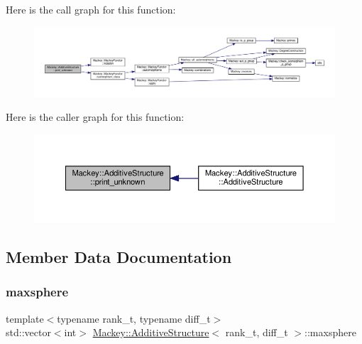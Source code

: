 Here is the call graph for this function\+:\nopagebreak
\begin{figure}[H]
\begin{center}
\leavevmode
\includegraphics[width=350pt]{classMackey_1_1AdditiveStructure_a6c68d66e89c3ad3a81dde8fd35837c3c_cgraph}
\end{center}
\end{figure}
Here is the caller graph for this function\+:\nopagebreak
\begin{figure}[H]
\begin{center}
\leavevmode
\includegraphics[width=350pt]{classMackey_1_1AdditiveStructure_a6c68d66e89c3ad3a81dde8fd35837c3c_icgraph}
\end{center}
\end{figure}


\subsection{Member Data Documentation}
\mbox{\label{classMackey_1_1AdditiveStructure_a1d26ee2b19d9d66744ee4d79c302d9c4}} 
\subsubsection{\texorpdfstring{maxsphere}{maxsphere}}
{\footnotesize\ttfamily template$<$typename rank\+\_\+t, typename diff\+\_\+t$>$ \\
std\+::vector$<$int$>$ \hyperlink{classMackey_1_1AdditiveStructure}{Mackey\+::\+Additive\+Structure}$<$ rank\+\_\+t, diff\+\_\+t $>$\+::maxsphere}



